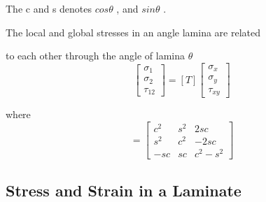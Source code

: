 \documentclass[USenglish]{article}
\begin{document}
The c and s denotes $cos\theta $ , and $sin\theta $ .

The local and global stresses in an angle lamina are related

to each other through the angle of lamina $\theta $
\begin{equation}\left[\begin{array}{l}\sigma _{1} \\ \sigma _{2} \\ \tau_{12}\end{array}\right]=[T]\left[\begin{array}{l}\sigma _{x} \\ \sigma _{y} \\\tau_{xy}\end{array}\right]
\end{equation}

where
\begin{equation}[T]=\left[\begin{array}{ccc}c^{2} & s^{2} & 2 s c \\ s^{2} & c^{2} & -2 s c \\ -s c & s c &c^{2}-s^{2}\end{array}\right] 
\end{equation}





\subsection{Stress and Strain in a Laminate}
\end{document}
